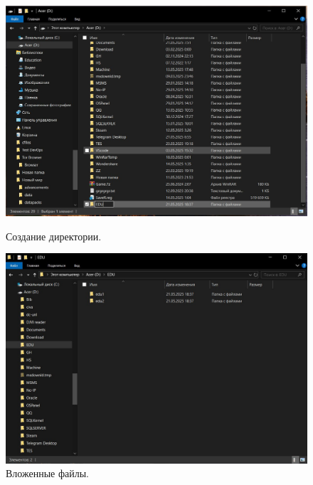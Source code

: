 \begin{figure}[h!]
    \centering
    \begin{minipage}[p]{0.45\linewidth}
    \centering
    \includegraphics[width=1\linewidth]{Pic/lab2/photo_2025-05-21_21-18-26.jpg}
    \caption{Создание директории.}
    \label{fig:DirEdu}
    \end{minipage}
    \hfill
    \begin{minipage}[p]{0.45\linewidth}
    \centering
    \includegraphics[width=1\linewidth]{Pic/lab2/photo_2025-05-21_21-18-28.jpg}
    \caption{Вложенные файлы.}
    \label{fig:filesinside}
    \end{minipage}
\end{figure}

\begin{figure}
\end{figure}

